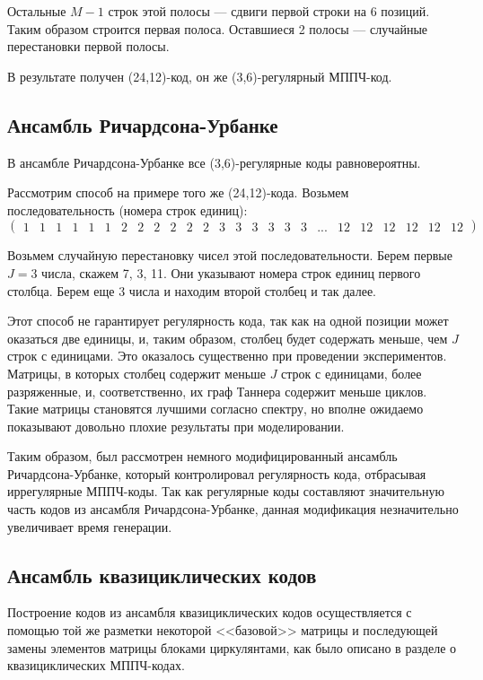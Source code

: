 Остальные $M-1$ строк этой полосы --- сдвиги первой строки на 6 позиций. Таким образом строится первая
полоса. Оставшиеся 2 полосы --- случайные перестановки первой полосы.

В результате получен (24,12)-код, он же (3,6)-регулярный МППЧ-код.

\subsection{Ансамбль Ричардсона-Урбанке}

В ансамбле Ричардсона-Урбанке все (3,6)-регулярные коды равновероятны.

Рассмотрим способ на примере того же (24,12)-кода.
Возьмем последовательность (номера строк единиц):
\[
\begin{pmatrix}
	1 & 1 & 1 & 1 & 1 & 1 & 2 & 2 & 2 & 2 & 2 & 2 & 3 & 3 & 3 & 3 & 3 & 3 & ... & 12 & 12 & 12 & 12 & 12 & 12
\end{pmatrix}
\]

Возьмем случайную перестановку чисел этой последовательности.
Берем первые $J=3$ числа, скажем 7, 3, 11. Они указывают номера строк единиц
первого столбца. Берем еще 3 числа и находим второй столбец и так далее.

Этот способ не гарантирует регулярность кода, так как на одной позиции может оказаться две единицы,
и, таким образом, столбец будет содержать меньше, чем $J$ строк с единицами. Это оказалось существенно при
проведении экспериментов. Матрицы, в которых столбец содержит меньше $J$ строк с единицами,
более разряженные, и, соответственно, их граф Таннера содержит меньше циклов. Такие матрицы
становятся лучшими согласно спектру, но вполне ожидаемо показывают довольно плохие результаты при моделировании.

Таким образом, был рассмотрен немного модифицированный ансамбль Ричардсона-Урбанке, который контролировал
регулярность кода, отбрасывая иррегулярные МППЧ-коды. Так как регулярные коды составляют значительную
часть кодов из ансамбля Ричардсона-Урбанке, данная модификация незначительно увеличивает время генерации.
\subsection{Ансамбль квазициклических кодов}

Построение кодов из ансамбля квазициклических кодов осуществляется с помощью той же разметки
некоторой <<базовой>> матрицы и последующей замены элементов матрицы блоками циркулянтами, как было
описано в разделе о квазициклических МППЧ-кодах.

